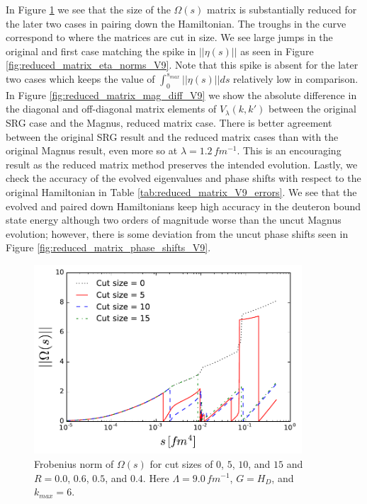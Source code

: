 \documentclass[preprintnumbers,floatfix,aps,prc,preprint]{revtex4-1}
\begin{document}
%
In Figure \ref{fig:reduced_matrix_omega_norms_V9} we see that the size of the $\Omega(s)$ matrix is substantially reduced for the later two cases in pairing down the Hamiltonian. The troughs in the curve correspond to where the matrices are cut in size. We see large jumps in the original and first case matching the spike in $||\eta(s)||$ as seen in Figure \ref{fig:reduced_matrix_eta_norms_V9}. Note that this spike is absent for the later two cases which keeps the value of $\int_{0}^{s_{max}} ||\eta(s)|| ds$ relatively low in comparison. \\

In Figure \ref{fig:reduced_matrix_mag_diff_V9} we show the absolute difference in the diagonal and off-diagonal matrix elements of $V_{\lambda}(k,k')$ between the original SRG case and the Magnus, reduced matrix case. There is better agreement between the original SRG result and the reduced matrix cases than with the original Magnus result, even more so at $\lambda = 1.2 \, fm^{-1}$. This is an encouraging result as the reduced matrix method preserves the intended evolution. Lastly, we check the accuracy of the evolved eigenvalues and phase shifts with respect to the original Hamiltonian in Table \ref{tab:reduced_matrix_V9_errors}. We see that the evolved and paired down Hamiltonians keep high accuracy in the deuteron bound state energy although two orders of magnitude worse than the uncut Magnus evolution; however, there is some deviation from the uncut phase shifts seen in Figure \ref{fig:reduced_matrix_phase_shifts_V9}.
%
\begin{figure}[H]
  \centering
  \includegraphics[width=10cm]{reduced_matrix_omega_norms_V9}
   \hspace*{0.05\textwidth}%
  \caption{Frobenius norm of $\Omega(s)$ for cut sizes of $0$, $5$, $10$, and $15$ and $R=0.0$, $0.6$, $0.5$, and $0.4$. Here $\Lambda=9.0 \, fm^{-1}$, $G=H_D$, and $k_{max}=6$.}
  \label{fig:reduced_matrix_omega_norms_V9}
\end{figure}
\end{document}
